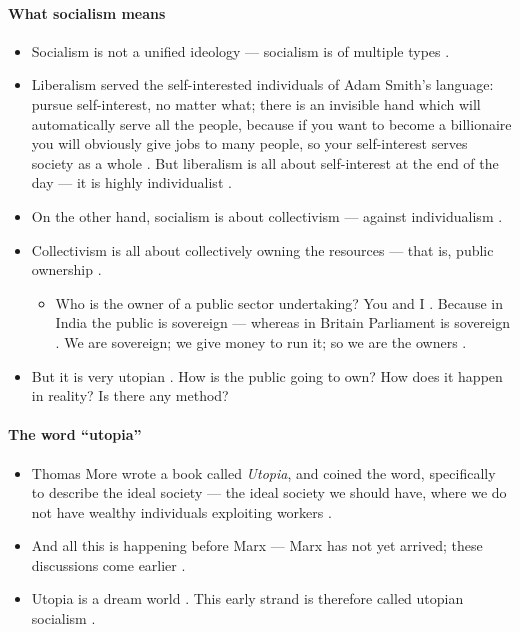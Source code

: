 \paragraph{What socialism means}
\begin{itemize}
    \item Socialism is not a unified ideology --- socialism is of multiple types .
    \item Liberalism served the self-interested individuals of Adam Smith's language: pursue self-interest, no matter what; there is an invisible hand which will automatically serve all the people, because if you want to become a billionaire you will obviously give jobs to many people, so your self-interest serves society as a whole . But liberalism is all about self-interest at the end of the day --- it is highly individualist .
    \item On the other hand, socialism is about collectivism --- against individualism .
    \item Collectivism is all about collectively owning the resources --- that is, public ownership .
    \begin{itemize}
        \item Who is the owner of a public sector undertaking? You and I . Because in India the public is sovereign --- whereas in Britain Parliament is sovereign . We are sovereign; we give money to run it; so we are the owners .
    \end{itemize}
    \item But it is very utopian . How is the public going to own? How does it happen in reality? Is there any method? 
\end{itemize}

\paragraph{The word ``utopia''}
\begin{itemize}
    \item Thomas More wrote a book called \emph{Utopia}, and coined the word, specifically to describe the ideal society --- the ideal society we should have, where we do not have wealthy individuals exploiting workers .
    \item And all this is happening before Marx --- Marx has not yet arrived; these discussions come earlier .
    \item Utopia is a dream world . This early strand is therefore called utopian socialism .
\end{itemize}

